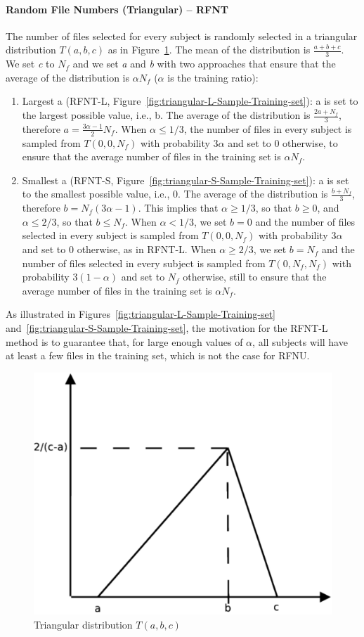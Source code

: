 \documentclass[10pt, conference, compsocconf]{IEEEtran}
\begin{document}
\paragraph{Random File Numbers (Triangular) -- RFNT}
The number of files selected for every subject is randomly selected in
a triangular distribution $T(a, b, c)$ as in Figure~\ref{fig:triangular}. The mean of the distribution is 
$\frac{a+b+c}{3}$. We set \textit{c} to $N_{f}$ and we set 
\textit{a} and \textit{b} with two approaches that ensure that the 
average of the distribution is $\alpha N_{f}$ ($\alpha$ is the training 
ratio):
\begin{enumerate}
        \item Largest a (RFNT-L, Figure~\ref{fig:triangular-L-Sample-Training-set}): a is set to the 
        largest possible value, i.e., b. The average of the 
        distribution is $\frac{2a+N_{f}}{3}$, therefore 
        $a=\frac{3\alpha-1}{2}N_{f}$. When $\alpha \leq 1/3$, the 
        number of files in every subject is sampled from $T(0, 0, N_f)$ 
        with probability $3\alpha$ and set to 0 otherwise, to ensure that the average number of files
        in the training set is $\alpha N_f$.
        \item Smallest a (RFNT-S, Figure~\ref{fig:triangular-S-Sample-Training-set}): a is 
        set to the smallest possible value, i.e., 0. The average of the 
        distribution is $\frac{b+N_{f}}{3}$, therefore 
        $b=N_{f}(3\alpha-1)$. This implies that $\alpha \geq 1/3$, so 
        that $b \geq 0$, and $\alpha \leq 2/3$, so that $b \leq N_f$. 
        When $\alpha < 1/3$, we set $b=0$ and the number of files 
        selected in every subject is sampled from $T(0, 0, N_f)$ with 
        probability $3\alpha$ and set to 0 otherwise, as in RFNT-L. 
        When $\alpha \geq 2/3$, we set $b=N_f$ and the number of files 
        selected in every subject is sampled from $T(0, N_f, N_f)$ with 
        probability $3(1-\alpha)$ and set to $N_f$ otherwise, still to 
        ensure that the average number of files in the training set is 
        $\alpha N_f$.
\end{enumerate}
As illustrated in Figures~\ref{fig:triangular-L-Sample-Training-set} 
and~\ref{fig:triangular-S-Sample-Training-set}, the motivation for the 
RFNT-L method is to guarantee that, for large enough values of 
$\alpha$, all subjects will have at least a few files in the training 
set, which is not the case for RFNU.
\begin{figure}
\centering
\includegraphics[width=0.5\columnwidth]{figures/triangular.pdf}
\caption{Triangular distribution $T(a, b, c)$}
\label{fig:triangular}
\end{figure}
\end{document}
